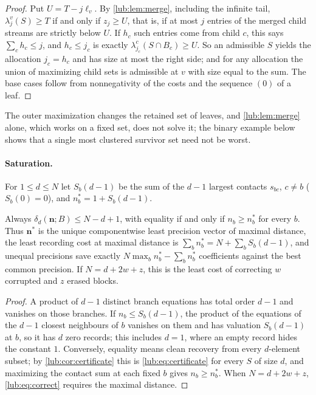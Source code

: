 \begin{proof}
Put $U=T-j\ell_v$. By \cref{lub:lem:merge}, including the infinite tail,
$\lambda_j^v(S)\ge T$ if and only if $z_j\ge U$, that is, if at most $j$ entries of the
merged child streams are strictly below $U$. If $h_c$ such entries come from child $c$, this
says $\sum_ch_c\le j$, and $h_c\le j_c$ is exactly $\lambda_{j_c}^c(S\cap B_c)\ge U$. So an
admissible $S$ yields the allocation $j_c=h_c$ and has size at most the right side; and for
any allocation the union of maximizing child sets is admissible at $v$ with size equal to the
sum. The base cases follow from nonnegativity of the costs and the sequence $(0)$ of a leaf.
\end{proof}

The outer maximization changes the retained set of leaves, and \cref{lub:lem:merge} alone,
which works on a fixed set, does not solve it; the binary example below shows that a single
most clustered survivor set need not be worst.

\paragraph{Saturation.}
For $1\le d\le N$ let $S_b(d-1)$ be the sum of the $d-1$ largest contacts $s_{bc}$, $c\ne b$
($S_b(0)=0$), and $n_b^*=1+S_b(d-1)$.

\begin{theorem}\label{lub:thm:compsat}
Always $\delta_d(\mathbf n;B)\le N-d+1$, with equality if and only if $n_b\ge n_b^*$ for every $b$. Thus
$\mathbf n^*$ is the unique componentwise least precision vector of maximal distance, the least
recording cost at maximal distance is $\sum_bn_b^*=N+\sum_bS_b(d-1)$, and unequal precisions save exactly
$N\max_bn_b^*-\sum_bn_b^*$ coefficients against the best common precision. If $N=d+2w+z$, this is the
least cost of correcting $w$ corrupted and $z$ erased blocks.
\end{theorem}

\begin{proof}
A product of $d-1$ distinct branch equations has total order $d-1$ and vanishes on those branches. If
$n_b\le S_b(d-1)$, the product of the equations of the $d-1$ closest neighbours of $b$ vanishes on them
and has valuation $S_b(d-1)$ at $b$, so it has $d$ zero records; this includes $d=1$, where an empty
record hides the constant $1$. Conversely, equality means clean recovery from every $d$-element subset;
by \cref{lub:cor:certificate} this is \eqref{lub:eq:certificate} for every $S$ of size $d$, and
maximizing the contact sum at each fixed $b$ gives $n_b\ge n_b^*$. When $N=d+2w+z$,
\eqref{lub:eq:correct} requires the maximal distance.
\end{proof}

